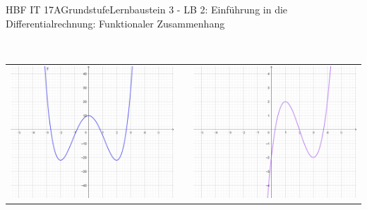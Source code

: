 \documentclass[oneside,openany,headings=optiontotoc,11pt,numbers=noenddot]{scrreprt}
\begin{document}
\begin{worksheet}{HBF IT 17A}{Grundstufe}{Lernbaustein 3 - LB 2: Einführung in die Differentialrechnung: Funktionaler Zusammenhang}
\begin{framed}
			\hdashrule[0.5ex][x]{\textwidth}{0.1mm}{8mm 2pt}\\
			\par
			\begin{tabularx}{\textwidth}{XlX}
				\includegraphics[scale=0.35]{Bilder/fktZusammenhf.jpg} & & \includegraphics[scale=0.35]{Bilder/fktZusammenhg.jpg}
			\end{tabularx}
		\end{framed}
	

\end{worksheet}
\end{document}
